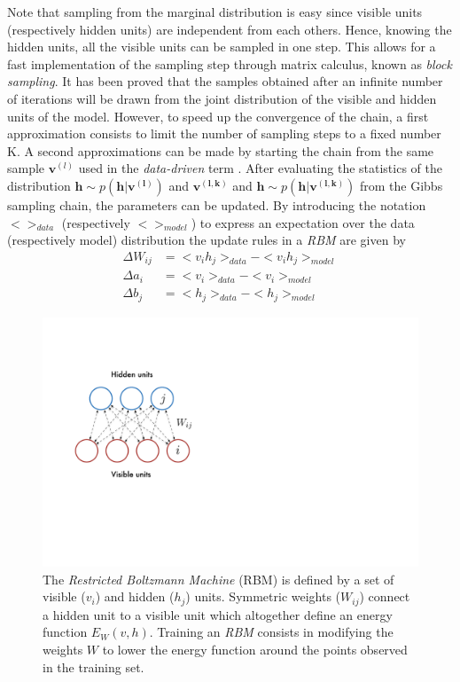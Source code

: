 \documentclass[letterpaper]{article}
\begin{document}
Note that sampling from the marginal distribution is easy since visible units (respectively hidden units) are independent from each others. Hence, knowing the hidden units, all the visible units can be sampled in one step. This allows for a fast implementation of the sampling step through matrix calculus, known as \textit{block sampling}.
It has been proved \cite{bengio2009learning} that the samples obtained after an infinite number of iterations will be drawn from the joint distribution of the visible and hidden units of the model. However, to speed up the convergence of the chain, a first approximation consists to limit the number of sampling steps to a fixed number K.
A second approximations can be made by starting the chain from the same sample $\bm{v}^{(l)}$ used in the \textit{data-driven} term \cite{hinton2010practical}. After evaluating the statistics of the distribution $\bm{h} \sim p(\bm{h}|\bm{v^{(l)}})$ and $\bm{v^{(l,k)}}$ and $\bm{h}\sim p(\bm{h}|\bm{v^{(l,k)}})$ from the Gibbs sampling chain, the parameters can be updated. By introducing the notation $<>_{data}$ (respectively $<>_{model}$) to express an expectation over the data (respectively model) distribution the update rules in a \textit{RBM} are given by
\begin{align}
\Delta W_{ij} &= <v_{i}h_{j} >_{data} - <v_{i}h_{j} >_{model}\\
\Delta a_{i} &= <v_{i}>_{data} - <v_{i}>_{model}\\
\Delta b_{j} &= <h_{j} >_{data} - <h_{j} >_{model}
\end{align}
\begin{figure}[h]
\centering
\includegraphics[scale=0.6]{RBM}
\caption{The \textit{Restricted Boltzmann Machine} (RBM) is defined by a set of visible ($v_{i}$) and hidden ($h_{j}$) units.  Symmetric weights ($W_{ij}$) connect a hidden unit to a visible unit which altogether define an energy function $E_{W}(v,h)$. Training an \textit{RBM} consists in modifying the weights $W$ to lower the energy function around the points observed in the training set.}
\label{fig:RBM}
\end{figure}
\end{document}
